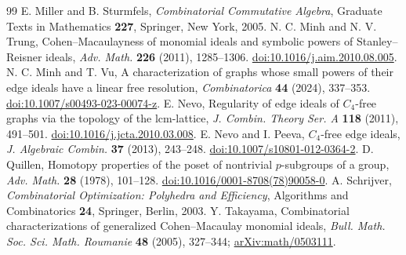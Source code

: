 \documentclass[11pt,a4paper]{article}
\theoremstyle{definition}
\begin{document}
\begin{thebibliography}{99}
 E. Miller and B. Sturmfels, \emph{Combinatorial Commutative Algebra}, Graduate Texts in Mathematics \textbf{227}, Springer, New York, 2005.
 N. C. Minh and N. V. Trung, Cohen--Macaulayness of monomial ideals and symbolic powers of Stanley--Reisner ideals, \emph{Adv. Math.} \textbf{226} (2011), 1285--1306. \href{https://doi.org/10.1016/j.aim.2010.08.005}{doi:10.1016/j.aim.2010.08.005}.
 N. C. Minh and T. Vu, A characterization of graphs whose small powers of their edge ideals have a linear free resolution, \emph{Combinatorica} \textbf{44} (2024), 337--353. \href{https://doi.org/10.1007/s00493-023-00074-z}{doi:10.1007/s00493-023-00074-z}.
 E. Nevo, Regularity of edge ideals of $C_4$-free graphs via the topology of the lcm-lattice, \emph{J. Combin. Theory Ser. A} \textbf{118} (2011), 491--501. \href{https://doi.org/10.1016/j.jcta.2010.03.008}{doi:10.1016/j.jcta.2010.03.008}.
 E. Nevo and I. Peeva, $C_4$-free edge ideals, \emph{J. Algebraic Combin.} \textbf{37} (2013), 243--248. \href{https://doi.org/10.1007/s10801-012-0364-2}{doi:10.1007/s10801-012-0364-2}.
 D. Quillen, Homotopy properties of the poset of nontrivial $p$-subgroups of a group, \emph{Adv. Math.} \textbf{28} (1978), 101--128. \href{https://doi.org/10.1016/0001-8708(78)90058-0}{doi:10.1016/0001-8708(78)90058-0}.
 A. Schrijver, \emph{Combinatorial Optimization: Polyhedra and Efficiency}, Algorithms and Combinatorics \textbf{24}, Springer, Berlin, 2003.
 Y. Takayama, Combinatorial characterizations of generalized Cohen--Macaulay monomial ideals, \emph{Bull. Math. Soc. Sci. Math. Roumanie} \textbf{48} (2005), 327--344; \href{https://arxiv.org/abs/math/0503111}{arXiv:math/0503111}.
\end{thebibliography}
\end{document}
